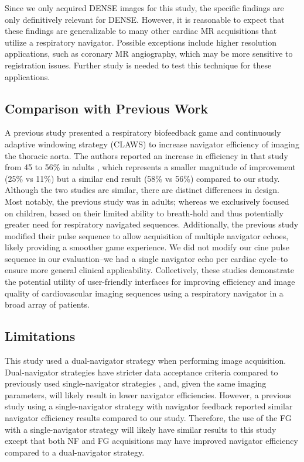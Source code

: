 		Since we only acquired DENSE images for this study,	the specific findings are only definitively relevant for DENSE. However, it is reasonable to expect that these findings are generalizable to many other cardiac MR acquisitions that utilize a respiratory navigator. Possible exceptions include higher resolution applications, such as coronary MR angiography, which may be more sensitive to registration issues. Further study is needed to test this technique for these applications.
		
	\subsection{Comparison with Previous Work}
		A previous study presented a respiratory biofeedback game and continuously adaptive windowing strategy (CLAWS) to increase navigator efficiency of imaging the thoracic aorta. The authors reported an increase in efficiency in that study from 45 to 56\% in adults \cite{Jhooti2011}, which represents a smaller magnitude of improvement (25\% vs 11\%) but a similar end result (58\% vs 56\%) compared to our study. Although the two studies are similar, there are distinct differences in design. Most notably, the previous study was in adults; whereas we exclusively focused on children, based on their limited ability to breath-hold and thus potentially greater need for respiratory navigated sequences. Additionally, the previous study modified their pulse sequence to allow acquisition of multiple navigator echoes, likely providing a smoother game experience. We did not modify our cine pulse sequence in our evaluation--we had a single navigator echo per cardiac cycle--to ensure more general clinical applicability. Collectively, these studies demonstrate the potential utility of user-friendly interfaces for improving efficiency and image quality of cardiovascular imaging sequences using a respiratory navigator in a broad array of patients.
	
	\subsection{Limitations}
		This study used a dual-navigator strategy when performing image acquisition. Dual-navigator strategies have stricter data acceptance criteria compared to previously used single-navigator strategies \cite{Zhong2010a}, and, given the same imaging parameters, will likely result in lower navigator efficiencies. However, a previous study using a single-navigator strategy with navigator feedback reported similar navigator efficiency results compared to our study. Therefore, the use of the FG with a single-navigator strategy will likely have similar results to this study except that both NF and FG acquisitions may have improved navigator efficiency compared to a dual-navigator strategy.
		
